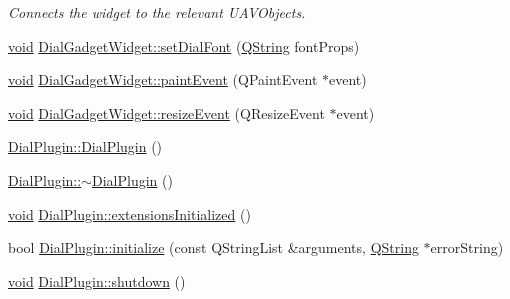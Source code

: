 \begin{DoxyCompactItemize}
\begin{DoxyCompactList}\small\item\em Connects the widget to the relevant U\-A\-V\-Objects. \end{DoxyCompactList}\item 
\hyperlink{group___u_a_v_objects_plugin_ga444cf2ff3f0ecbe028adce838d373f5c}{void} \hyperlink{group___dial_plugin_ga47e399b79845057cc9f7eab02fef380a}{Dial\-Gadget\-Widget\-::set\-Dial\-Font} (\hyperlink{group___u_a_v_objects_plugin_gab9d252f49c333c94a72f97ce3105a32d}{Q\-String} font\-Props)
\item 
\hyperlink{group___u_a_v_objects_plugin_ga444cf2ff3f0ecbe028adce838d373f5c}{void} \hyperlink{group___dial_plugin_ga35b76a1088cc50996f66ef23da926785}{Dial\-Gadget\-Widget\-::paint\-Event} (Q\-Paint\-Event $\ast$event)
\item 
\hyperlink{group___u_a_v_objects_plugin_ga444cf2ff3f0ecbe028adce838d373f5c}{void} \hyperlink{group___dial_plugin_ga4ce19a0118b1518cf0469e2fc69dc86b}{Dial\-Gadget\-Widget\-::resize\-Event} (Q\-Resize\-Event $\ast$event)
\item 
\hyperlink{group___dial_plugin_ga414d0b2d29e6c9d41df85ac25e1899fa}{Dial\-Plugin\-::\-Dial\-Plugin} ()
\item 
\hyperlink{group___dial_plugin_gaea6ec646d171578f8a22d63b9b28016c}{Dial\-Plugin\-::$\sim$\-Dial\-Plugin} ()
\item 
\hyperlink{group___u_a_v_objects_plugin_ga444cf2ff3f0ecbe028adce838d373f5c}{void} \hyperlink{group___dial_plugin_gac703254d72e140e8ff7b4c23ddb46020}{Dial\-Plugin\-::extensions\-Initialized} ()
\item 
bool \hyperlink{group___dial_plugin_ga59561e7e0f5635938f8b83931c025b67}{Dial\-Plugin\-::initialize} (const Q\-String\-List \&arguments, \hyperlink{group___u_a_v_objects_plugin_gab9d252f49c333c94a72f97ce3105a32d}{Q\-String} $\ast$error\-String)
\item 
\hyperlink{group___u_a_v_objects_plugin_ga444cf2ff3f0ecbe028adce838d373f5c}{void} \hyperlink{group___dial_plugin_ga096efc39bed83964551f3a4a8bd1a29d}{Dial\-Plugin\-::shutdown} ()
\end{DoxyCompactItemize}

